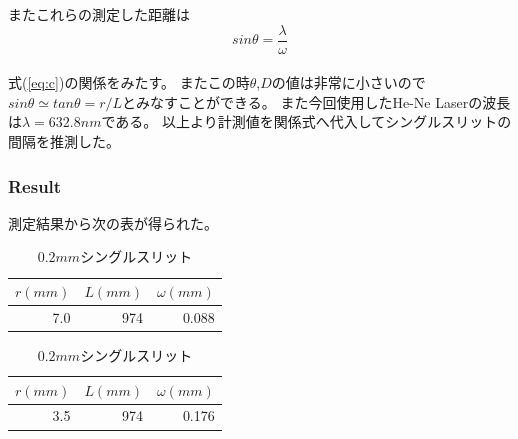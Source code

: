 \documentclass[11pt, a4paper]{jsarticle}
\begin{document}
またこれらの測定した距離は
\begin{equation}
    sin\theta = \frac{\lambda}{\omega} \label{eq:c}
\end{equation}\\
式(\ref{eq:c})の関係をみたす。
またこの時$\theta$,$D$の値は非常に小さいので$sin\theta \simeq tan\theta = r/L$とみなすことができる。
また今回使用したHe-Ne Laserの波長は$\lambda = 632.8nm$である。
以上より計測値を関係式へ代入してシングルスリットの間隔を推測した。

\subsubsection{Result}
測定結果から次の表が得られた。\\
\begin{table}[htb]
 \begin{minipage}{0.45\hsize}
  \begin{center}
    \caption{$0.1mm$シングルスリット}
    \begin{tabular}{rrr} \hline
        $r(mm)$ & $L(mm)$ & $\omega(mm)$  \\ \hline
        7.0    & 974 & 0.088\\ \hline
    \end{tabular}
    \label{tab:d}
  \end{center}
 \end{minipage}
 \begin{minipage}{0.45\hsize}
  \begin{center}
    \caption{$0.2mm$シングルスリット}
    \begin{tabular}{rrr} \hline
        $r(mm)$ & $L(mm)$ & $\omega(mm)$  \\ \hline
        3.5    & 974 & 0.176\\ \hline
    \end{tabular}
    \label{tab:e}
  \end{center}
 \end{minipage}
\end{table}
\end{document}
